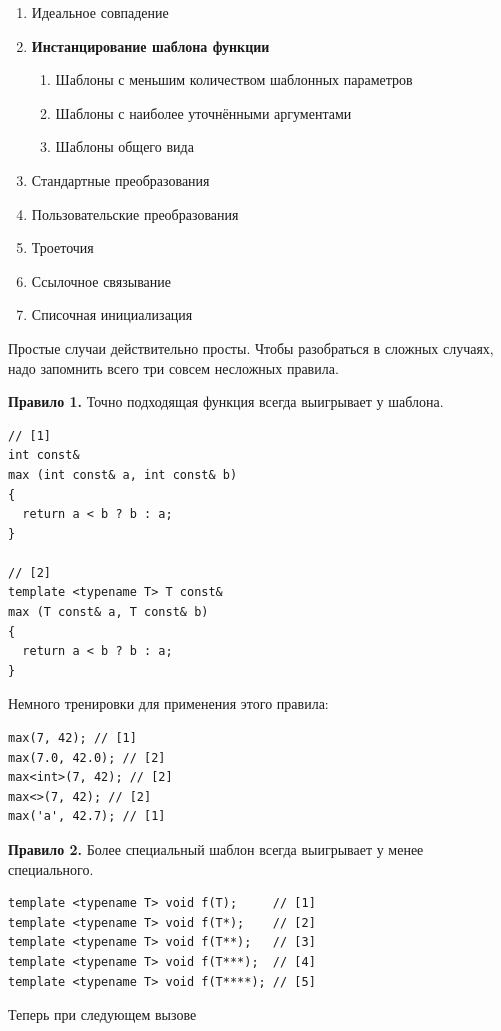 \documentclass[a4paper,12pt,oneside]{book}
\begin{document}
\begin{enumerate}
\item Идеальное совпадение
\item \textbf{Инстанцирование шаблона функции}
  \begin{enumerate}
  \item Шаблоны с меньшим количеством шаблонных параметров
  \item Шаблоны с наиболее уточнёнными аргументами
  \item Шаблоны общего вида
  \end{enumerate}
\item Стандартные преобразования
\item Пользовательские преобразования
\item Троеточия
\item Ссылочное связывание
\item Списочная инициализация
\end{enumerate}

Простые случаи действительно просты. Чтобы разобраться в сложных случаях, надо запомнить всего три совсем несложных правила.

\textbf{Правило 1.} Точно подходящая функция всегда выигрывает у шаблона.

\begin{lstlisting}
// [1]
int const& 
max (int const& a, int const& b)
{
  return a < b ? b : a; 
}

// [2]
template <typename T> T const& 
max (T const& a, T const& b)
{
  return a < b ? b : a; 
}
\end{lstlisting}

Немного тренировки для применения этого правила:

\begin{lstlisting}
max(7, 42); // [1]
max(7.0, 42.0); // [2]  
max<int>(7, 42); // [2]
max<>(7, 42); // [2]
max('a', 42.7); // [1]
\end{lstlisting}

\textbf{Правило 2.} Более специальный шаблон всегда выигрывает у менее специального.

\begin{lstlisting}
template <typename T> void f(T);     // [1]
template <typename T> void f(T*);    // [2]
template <typename T> void f(T**);   // [3]
template <typename T> void f(T***);  // [4]
template <typename T> void f(T****); // [5]
\end{lstlisting}

Теперь при следующем вызове
\end{document}
